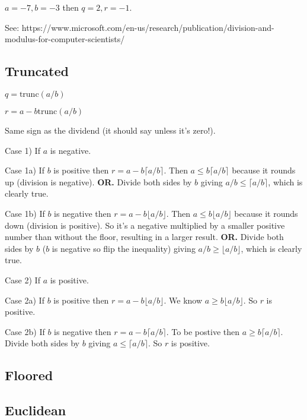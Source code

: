 $a = -7, b = -3$ then $q = 2, r = -1$.

See: https://www.microsoft.com/en-us/research/publication/division-and-modulus-for-computer-scientists/

\subsection{Truncated}

$q = \textrm{trunc}(a/b)$

$r = a - b \textrm{trunc}(a/b)$

Same sign as the dividend (it should say unless it's zero!).

Case 1) If $a$ is negative.

Case 1a) If $b$ is positive then $r = a - b \lceil a/b \rceil$. Then $a \leq b
\lceil a/b \rceil$ because it rounds up (division is negative). \textbf{OR.}
Divide both sides by $b$ giving $a/b \leq \lceil a/b \rceil$, which is clearly
true.

Case 1b) If $b$ is negative then $r = a - b \lfloor a/b \rfloor$. Then $a \leq b
\lfloor a/b \rfloor$ because it rounds down (division is positive). So it's a
negative multiplied by a smaller positive number than without the floor,
resulting in a larger result. \textbf{OR.} Divide both sides by $b$ ($b$ is
negative so flip the inequality) giving $a/b \geq \lfloor a/b \rfloor$, which is
clearly true.

Case 2) If $a$ is positive.

Case 2a) If $b$ is positive then $r = a - b \lfloor a/b \rfloor$.
         We know $a \geq b \lfloor a/b \rfloor$.
         So $r$ is positive.

Case 2b) If $b$ is negative then $r = a - b \lceil a/b \rceil$.
         To be postive then $a \geq b \lceil a/b \rceil$.
         Divide both sides by $b$ giving $a \leq \lceil a/b \rceil$.
         So $r$ is positive.

\subsection{Floored}

\subsection{Euclidean}
